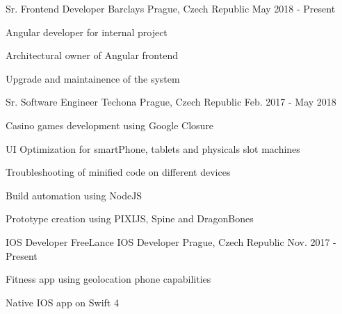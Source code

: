 

\begin{cventries}

    \cventry
    {Sr. Frontend Developer} %
    {Barclays} %
    {Prague, Czech Republic} %
    {May 2018 - Present} %
    {
    \begin{cvitems} %
        \item {Angular developer for internal project}
        \item {Architectural owner of Angular frontend}
        \item {Upgrade and maintainence of the system}
    \end{cvitems}
    }

    \cventry
    {Sr. Software Engineer} %
    {Techona} %
    {Prague, Czech Republic} %
    {Feb. 2017 - May 2018} %
    {
    \begin{cvitems} %
        \item {Casino games development using Google Closure}
        \item {UI Optimization for smartPhone, tablets and physicals slot machines}
        \item {Troubleshooting of minified code on different devices}
        \item {Build automation using NodeJS}
        \item {Prototype creation using PIXIJS, Spine and DragonBones}
    \end{cvitems}
    }

    \cventry
    {IOS Developer} %
    {FreeLance IOS Developer} %
    {Prague, Czech Republic} %
    {Nov. 2017 - Present} %
    {
    \begin{cvitems} %
        \item {Fitness app using geolocation phone capabilities}
        \item {Native IOS app on Swift 4}
    \end{cvitems}
    }


\end{cventries}
